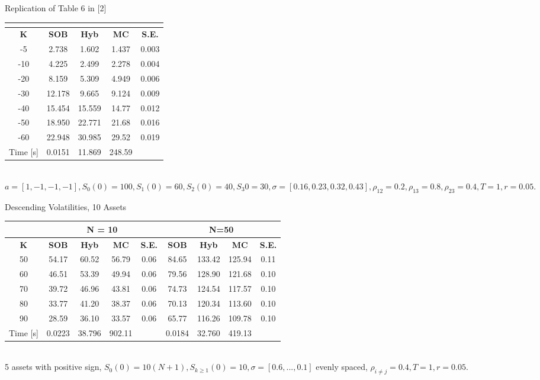 \documentclass[a4paper]{article}
\begin{document}
\begin {table}[H]
\caption {Replication of Table 6 in [2]} 
\begin{center}
\begin{tabular}{c|c c c c}
\hline
\multicolumn{1}{c|}{} & \multicolumn{4}{|c}{} \\ 
\hline
  \textbf{K} & \textbf{SOB} & \textbf{Hyb} & \textbf{MC} & \textbf{S.E.}\\
  -5 & 2.738	& 1.602	& 1.437    &  0.003\\
-10 & 4.225	& 2.499	& 2.278    & 0.004\\
-20 & 8.159	& 5.309	& 4.949    & 0.006\\
-30 & 12.178	& 9.665	& 9.124& 0.009\\
-40 & 15.454	& 15.559	& 14.77 & 0.012\\
-50 & 18.950	& 22.771	& 21.68 & 0.016\\
-60 & 22.948	& 30.985	& 29.52 & 0.019\\
\hline
Time [s] & 0.0151 & 11.869 & 248.59 & \\
\hline
\end{tabular}
\\[8pt]
\caption*{$a=[1,-1,-1, -1], S_0(0)=100, S_1(0) = 60, S_2(0) = 40, S_3{0} = 30, \sigma = [0.16, 0.23, 0.32, 0.43], \rho_{12} = 0.2, \rho_{13} = 0.8, \rho_{23} = 0.4, T = 1, r=0.05.$}
\end{center}
\end{table}

\begin {table}[H]
\caption {Descending Volatilities, 10 Assets} 
\begin{center}
\begin{tabular}{c|c c c c|c c c c}
\hline
\multicolumn{1}{c|}{} & \multicolumn{4}{|c|}{N = 10} & \multicolumn{4}{|c}{N=50} \\ 
\hline
  \textbf{K} & \textbf{SOB} & \textbf{Hyb} & \textbf{MC} & \textbf{S.E.} & \textbf{SOB} & \textbf{Hyb} & \textbf{MC} & \textbf{S.E.}\\
50 &	54.17& 60.52 	& 56.79 & 0.06 & 84.65 & 133.42 & 125.94 & 0.11 \\
60 & 46.51	& 53.39 	& 49.94 & 0.06   & 79.56  & 128.90 & 121.68 & 0.10  \\
70 & 39.72	& 46.96	& 43.81 & 0.06  & 74.73 & 124.54 & 117.57 & 0.10\\
80 & 33.77	& 41.20 	& 38.37 & 0.06  & 70.13  & 120.34 & 113.60 & 0.10  \\
90 & 28.59& 36.10	& 33.57  & 0.06  & 65.77 & 116.26 & 109.78 &0.10\\
\hline
Time [s] & 0.0223 & 38.796 & 902.11 & & 0.0184 & 32.760 & 419.13 \\
\hline
\end{tabular}
\\[8pt]
\caption*{5 assets with positive sign, $S_0(0)=10(N+1), S_{k\geq1}(0) = 10, \sigma = [0.6, ..., 0.1]$ evenly spaced, $\rho_{i\neq j} = 0.4, T = 1, r=0.05.$}
\end{center}
\end{table}
\end{document}
